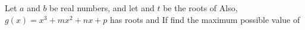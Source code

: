 Let $a$ and $b$ be real numbers, and let   and $t$ be the roots of   Also, $g(x)=x^3+mx^2+nx+p$ has roots   and   If  find the maximum possible value of 